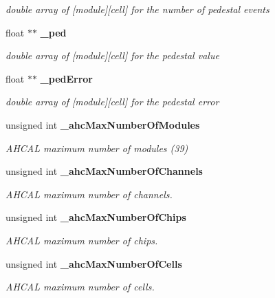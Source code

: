 \begin{DoxyCompactItemize}
\begin{DoxyCompactList}\small\item\em double array of [module][cell] for the number of pedestal events \end{DoxyCompactList}\item 
float $\ast$$\ast$ {\bf \-\_\-ped}\label{classCALICE_1_1PedestalProcessor_a90da1932accfd689ab713b4cc576ee6d}

\begin{DoxyCompactList}\small\item\em double array of [module][cell] for the pedestal value \end{DoxyCompactList}\item 
float $\ast$$\ast$ {\bf \-\_\-ped\-Error}\label{classCALICE_1_1PedestalProcessor_a127197da1199d8cecd356718609616e8}

\begin{DoxyCompactList}\small\item\em double array of [module][cell] for the pedestal error \end{DoxyCompactList}\item 
unsigned int {\bf \-\_\-ahc\-Max\-Number\-Of\-Modules}\label{classCALICE_1_1PedestalProcessor_a476f3cc6d6a29482ec95e2fd3d84081e}

\begin{DoxyCompactList}\small\item\em A\-H\-C\-A\-L maximum number of modules (39) \end{DoxyCompactList}\item 
unsigned int {\bf \-\_\-ahc\-Max\-Number\-Of\-Channels}\label{classCALICE_1_1PedestalProcessor_a48806ad75d6e2d07b74b94983f3b0c8b}

\begin{DoxyCompactList}\small\item\em A\-H\-C\-A\-L maximum number of channels. \end{DoxyCompactList}\item 
unsigned int {\bf \-\_\-ahc\-Max\-Number\-Of\-Chips}\label{classCALICE_1_1PedestalProcessor_ab39bcf808bee762e209218547e4e8e3b}

\begin{DoxyCompactList}\small\item\em A\-H\-C\-A\-L maximum number of chips. \end{DoxyCompactList}\item 
unsigned int {\bf \-\_\-ahc\-Max\-Number\-Of\-Cells}\label{classCALICE_1_1PedestalProcessor_ab6b7f92f8127ddf820ce1463f4870457}

\begin{DoxyCompactList}\small\item\em A\-H\-C\-A\-L maximum number of cells. \end{DoxyCompactList}\end{DoxyCompactItemize}


